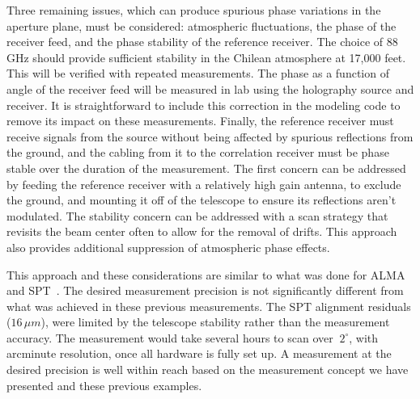 Three remaining issues, which can produce spurious phase variations in the aperture plane, must be considered: atmospheric fluctuations, the phase of the receiver feed, and the phase stability of the reference receiver.  The choice of 88 GHz should provide sufficient stability in the Chilean atmosphere at 17,000 feet.  This will be verified with repeated measurements.  The phase as a function of angle of the receiver feed will be measured in lab using the holography source and receiver.  It is straightforward to include this correction in the modeling code to remove its impact on these measurements.  Finally, the reference receiver must receive signals from the source without being affected by spurious reflections from the ground, and the cabling from it to the correlation receiver must be phase stable over the duration of the measurement.  The first concern can be addressed by feeding the reference receiver with a relatively high gain antenna, to exclude the ground, and mounting it off of the telescope to ensure its reflections aren't modulated.  The stability concern can be addressed with a scan strategy that revisits the beam center often to allow for the removal of drifts.  This approach also provides additional suppression of atmospheric phase effects.  

This approach and these considerations are similar to what was done for ALMA~\cite{alma_holog} and SPT~\cite{Carlstrom_2011}. The desired measurement precision is not significantly different from what was achieved in these previous measurements.  The SPT alignment residuals ($16\,\mu m$), were limited by the telescope stability rather than the measurement accuracy.  The measurement would take several hours to scan over $~2^\circ$, with arcminute resolution, once all hardware is fully set up.  A measurement at the desired precision is well within reach based on the measurement concept we have presented and these previous examples.


